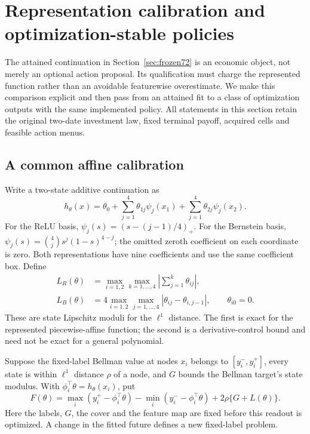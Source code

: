 \section{Representation calibration and optimization-stable policies}\label{sec:calibration81}
The attained continuation in Section~\ref{sec:frozen72} is an economic object, not merely an optional action proposal. Its qualification must charge the represented function rather than an avoidable featurewise overestimate. We make this comparison explicit and then pass from an attained fit to a class of optimization outputs with the same implemented policy. All statements in this section retain the original two-date investment law, fixed terminal payoff, acquired cells and feasible action menus.

\subsection{A common affine calibration}
Write a two-state additive continuation as
\[
 h_\theta(x)=\theta_0+\sum_{j=1}^4\theta_{1j}\psi_j(x_1)
                         +\sum_{j=1}^4\theta_{2j}\psi_j(x_2).
\]
For the ReLU basis, $\psi_j(s)=(s-(j-1)/4)_+$. For the Bernstein basis, $\psi_j(s)=\binom4j s^j(1-s)^{4-j}$; the omitted zeroth coefficient on each coordinate is zero. Both representations have nine coefficients and use the same coefficient box. Define
\begin{align}
 L_R(\theta)&=\max_{i=1,2}\max_{k=1,\ldots,4}
                      \left|\sum_{j=1}^k\theta_{ij}\right|,\label{eq:relu-modulus81}\\
 L_B(\theta)&=4\max_{i=1,2}\max_{j=1,\ldots,4}
                      |\theta_{ij}-\theta_{i,j-1}|,
                      \qquad \theta_{i0}=0.\label{eq:bernstein-modulus81}
\end{align}
These are state Lipschitz moduli for the $\ell^1$ distance. The first is exact for the represented piecewise-affine function; the second is a derivative-control bound and need not be exact for a general polynomial.

Suppose the fixed-label Bellman value at nodes $x_i$ belongs to $[y_i^-,y_i^+]$, every state is within $\ell^1$ distance $\rho$ of a node, and $G$ bounds the Bellman target's state modulus. With $\phi_i^\top\theta=h_\theta(x_i)$, put
\begin{equation}\label{eq:qualification81}
 F(\theta)=\max_i(y_i^+-\phi_i^\top\theta)
       -\min_i(y_i^--\phi_i^\top\theta)+2\rho\{G+L(\theta)\}.
\end{equation}
Here the labels, $G$, the cover and the feature map are fixed before this readout is optimized. A change in the fitted future defines a new fixed-label problem.

